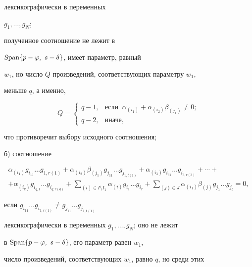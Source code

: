 \begin{pf}
лексикографически в переменных 


$g_{1},\dotsc,g_{N}$;


полученное соотношение не лежит в


$\Span\lbrace p-\varphi,\ s-\delta\rbrace$, имеет параметр, равный


$w_{1}$, но число $Q$ произведений, соответствующих параметру $w_{1}$,


меньше $q$, а именно,


$$


Q=


\begin{cases}


q-1, & \text{если }\ \alpha_{(i_{1})}+\alpha_{(i_{2})}\beta_{(j_{1})}\ne0;\\


q-2, & \text{иначе},


\end{cases}


$$


что противоречит выбору исходного соотношения;





б) соотношение


\begin{multline*}


\alpha_{(i_{1})}g_{i_{11}}\dotsc g_{1,r(1)}+


\alpha_{(i_{2})}\beta_{(j_{1})}g_{j_{11}}\dotsc g_{j_{1,t(1)}}+


\alpha_{(i_{3})}g_{i_{31}}\dotsc g_{i_{3,r(3)}}+\dotsb+ \\


%


+\alpha_{(i_{q})}g_{i_{q,1}}\dotsc g_{i_{q,r(q)}}+


\sum_{(i)\in I\setminus I_{1}}\alpha_{(i)}g_{i_{1}}\dotsc g_{i_{r}}+


\sum_{(j)\in J}\alpha_{(i_{1})}\beta_{(j)}g_{j_{1}}\dotsc g_{j_{t}}=0,


\end{multline*}


если $g_{i_{11}}\dotsc g_{i_{1,r(1)}}\ne g_{j_{11}}\dotsc g_{j_{1,t(1)}}$


лексикографически в переменных $g_{1},\dotsc,g_{N}$; оно не лежит


в $\Span\lbrace p-\varphi,\ s-\delta\rbrace$, его параметр равен $w_{1}$,


число произведений, соответствующих $w_{1}$, равно $q$, но среди этих



\end{pf}
